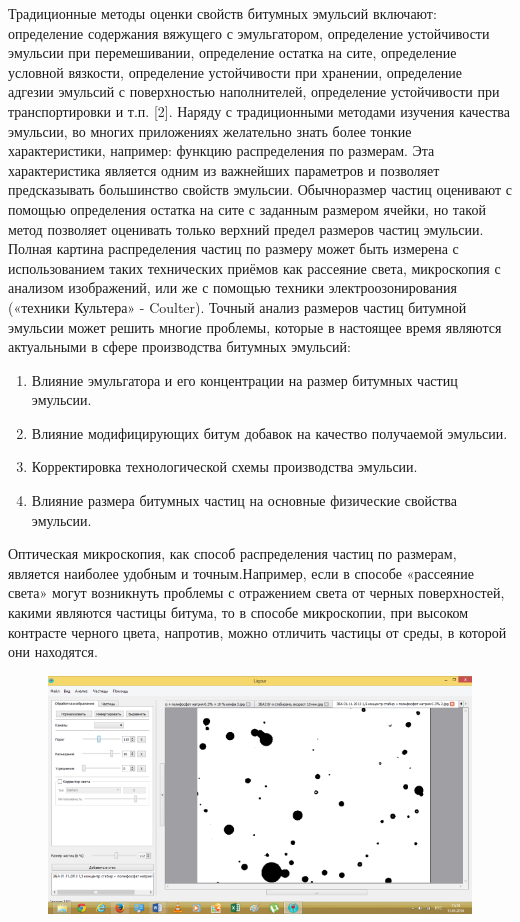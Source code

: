 Традиционные методы оценки свойств битумных эмульсий включают: определение содержания вяжущего с эмульгатором, определение устойчивости эмульсии при перемешивании, определение остатка на сите, определение условной вязкости, определение устойчивости при хранении, определение адгезии эмульсий с поверхностью наполнителей, определение устойчивости при транспортировки и т.п. [2].  Наряду с традиционными методами изучения  качества эмульсии, во многих приложениях желательно знать более тонкие характеристики, например: функцию распределения по размерам. Эта характеристика является одним из важнейших параметров и позволяет предсказывать большинство свойств эмульсии. Обычноразмер частиц оценивают с помощью определения остатка на сите с заданным размером ячейки, но такой метод позволяет оценивать только верхний предел размеров частиц эмульсии. Полная картина распределения частиц по размеру может быть измерена с использованием таких технических приёмов как рассеяние света, микроскопия с анализом изображений, или же с помощью техники электроозонирования («техники Культера» - Coulter). Точный анализ размеров частиц битумной эмульсии может решить многие проблемы, которые в настоящее время являются актуальными в сфере производства битумных эмульсий:
\begin{enumerate}
\item Влияние эмульгатора и его концентрации на размер битумных частиц эмульсии.
\item Влияние модифицирующих битум добавок на качество получаемой эмульсии.
\item Корректировка технологической схемы производства эмульсии.
\item Влияние размера битумных частиц на основные физические свойства эмульсии.
\end{enumerate}

Оптическая микроскопия, как способ распределения частиц по размерам, является наиболее удобным и точным.Например, если в способе «рассеяние света» могут возникнуть проблемы с отражением света от черных поверхностей, какими являются частицы битума, то в способе микроскопии, при высоком контрасте черного цвета, напротив, можно отличить частицы от среды, в которой они находятся.

\begin{figure}[h]
	\centering
	\includegraphics{images/em_00}
\end{figure}

